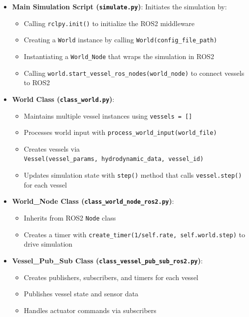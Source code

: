 \documentclass[
  letterpaper,
  DIV=11,
  numbers=noendperiod]{scrreprt}
\providecommand{\tightlist}{%
  \setlength{\itemsep}{0pt}\setlength{\parskip}{0pt}}\usepackage{longtable,booktabs,array}
\begin{document}
\begin{itemize}
\tightlist
\item
  \textbf{Main Simulation Script (\texttt{simulate.py})}: Initiates the
  simulation by:

  \begin{itemize}
  \tightlist
  \item
    Calling \texttt{rclpy.init()} to initialize the ROS2 middleware
  \item
    Creating a \texttt{World} instance by calling
    \texttt{World(config\_file\_path)}
  \item
    Instantiating a \texttt{World\_Node} that wraps the simulation in
    ROS2
  \item
    Calling \texttt{world.start\_vessel\_ros\_nodes(world\_node)} to
    connect vessels to ROS2
  \end{itemize}
\item
  \textbf{World Class (\texttt{class\_world.py})}:

  \begin{itemize}
  \tightlist
  \item
    Maintains multiple vessel instances using
    \texttt{vessels\ =\ {[}{]}}
  \item
    Processes world input with
    \texttt{process\_world\_input(world\_file)}
  \item
    Creates vessels via
    \texttt{Vessel(vessel\_params,\ hydrodynamic\_data,\ vessel\_id)}
  \item
    Updates simulation state with \texttt{step()} method that calls
    \texttt{vessel.step()} for each vessel
  \end{itemize}
\item
  \textbf{World\_Node Class (\texttt{class\_world\_node\_ros2.py})}:

  \begin{itemize}
  \tightlist
  \item
    Inherits from ROS2 \texttt{Node} class
  \item
    Creates a timer with
    \texttt{create\_timer(1/self.rate,\ self.world.step)} to drive
    simulation
  \end{itemize}
\item
  \textbf{Vessel\_Pub\_Sub Class
  (\texttt{class\_vessel\_pub\_sub\_ros2.py})}:

  \begin{itemize}
  \tightlist
  \item
    Creates publishers, subscribers, and timers for each vessel
  \item
    Publishes vessel state and sensor data
  \item
    Handles actuator commands via subscribers
  \end{itemize}
\end{itemize}
\end{document}
